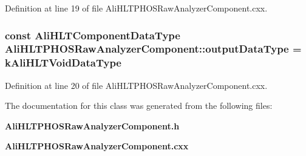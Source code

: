 Definition at line 19 of file Ali\-HLTPHOSRaw\-Analyzer\-Component.cxx.
\subsubsection{\setlength{\rightskip}{0pt plus 5cm}const Ali\-HLTComponent\-Data\-Type {\bf Ali\-HLTPHOSRaw\-Analyzer\-Component::output\-Data\-Type} = k\-Ali\-HLTVoid\-Data\-Type\hspace{0.3cm}{\tt  [static, private]}}\label{classAliHLTPHOSRawAnalyzerComponent_AliHLTPHOSRawAnalyzerComponentv1}




Definition at line 20 of file Ali\-HLTPHOSRaw\-Analyzer\-Component.cxx.

The documentation for this class was generated from the following files:\begin{CompactItemize}
\item 
{\bf Ali\-HLTPHOSRaw\-Analyzer\-Component.h}\item 
{\bf Ali\-HLTPHOSRaw\-Analyzer\-Component.cxx}\end{CompactItemize}
